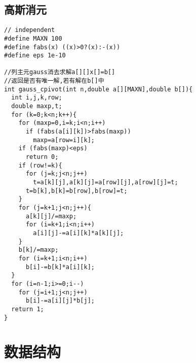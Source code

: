 \subsection{高斯消元}
\begin{lstlisting}[language={}]
// independent
#define MAXN 100
#define fabs(x) ((x)>0?(x):-(x))
#define eps 1e-10

//列主元gauss消去求解a[][]x[]=b[]
//返回是否有唯一解,若有解在b[]中
int gauss_cpivot(int n,double a[][MAXN],double b[]){
  int i,j,k,row;
  double maxp,t;
  for (k=0;k<n;k++){
    for (maxp=0,i=k;i<n;i++)
      if (fabs(a[i][k])>fabs(maxp))
        maxp=a[row=i][k];
    if (fabs(maxp)<eps)
      return 0;
    if (row!=k){
      for (j=k;j<n;j++)
        t=a[k][j],a[k][j]=a[row][j],a[row][j]=t;
      t=b[k],b[k]=b[row],b[row]=t;
    }
    for (j=k+1;j<n;j++){
      a[k][j]/=maxp;
      for (i=k+1;i<n;i++)
        a[i][j]-=a[i][k]*a[k][j];
    }
    b[k]/=maxp;
    for (i=k+1;i<n;i++)
      b[i]-=b[k]*a[i][k];
  }
  for (i=n-1;i>=0;i--)
    for (j=i+1;j<n;j++)
      b[i]-=a[i][j]*b[j];
  return 1;
}
\end{lstlisting}

\section{数据结构}
